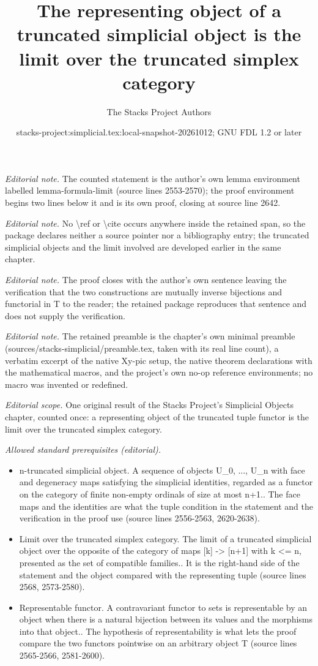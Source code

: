 \documentclass{stacks-project}
\title{The representing object of a truncated simplicial object is the limit over the truncated simplex category}
\author{The Stacks Project Authors}
\date{stacks-project:simplicial.tex:local-snapshot-20261012; GNU FDL 1.2 or later}
\theoremstyle{plain}
\theoremstyle{definition}
\theoremstyle{remark}
\numberwithin{equation}{subsection}
\begin{document}
\maketitle
\noindent\textit{Editorial note.} The counted statement is the author's own lemma environment labelled lemma-formula-limit (source lines 2553-2570); the proof environment begins two lines below it and is its own proof, closing at source line 2642.\par\medskip
\noindent\textit{Editorial note.} No \textbackslash{}ref or \textbackslash{}cite occurs anywhere inside the retained span, so the package declares neither a source pointer nor a bibliography entry; the truncated simplicial objects and the limit involved are developed earlier in the same chapter.\par\medskip
\noindent\textit{Editorial note.} The proof closes with the author's own sentence leaving the verification that the two constructions are mutually inverse bijections and functorial in T to the reader; the retained package reproduces that sentence and does not supply the verification.\par\medskip
\noindent\textit{Editorial note.} The retained preamble is the chapter's own minimal preamble (sources/stacks-simplicial/preamble.tex, taken with its real line count), a verbatim excerpt of the native Xy-pic setup, the native theorem declarations with the mathematical macros, and the project's own no-op reference environments; no macro was invented or redefined.\par\medskip
\noindent\textit{Editorial scope.} One original result of the Stacks Project's Simplicial Objects chapter, counted once: a representing object of the truncated tuple functor is the limit over the truncated simplex category.\par\medskip
\noindent\textit{Allowed standard prerequisites (editorial).}\begin{itemize}
\item n-truncated simplicial object. A sequence of objects U\_0, ..., U\_n with face and degeneracy maps satisfying the simplicial identities, regarded as a functor on the category of finite non-empty ordinals of size at most n+1.. The face maps and the identities are what the tuple condition in the statement and the verification in the proof use (source lines 2556-2563, 2620-2638).
\item Limit over the truncated simplex category. The limit of a truncated simplicial object over the opposite of the category of maps [k] -> [n+1] with k <= n, presented as the set of compatible families.. It is the right-hand side of the statement and the object compared with the representing tuple (source lines 2568, 2573-2580).
\item Representable functor. A contravariant functor to sets is representable by an object when there is a natural bijection between its values and the morphisms into that object.. The hypothesis of representability is what lets the proof compare the two functors pointwise on an arbitrary object T (source lines 2565-2566, 2581-2600).
\end{itemize}\medskip
\end{document}
